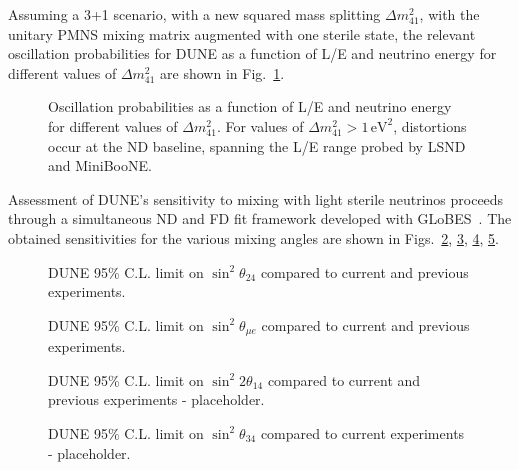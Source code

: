 Assuming a 3+1 scenario, with a new squared mass splitting $\Delta m^2_{41}$, with the unitary PMNS mixing matrix augmented with one sterile state, the relevant oscillation probabilities for DUNE as a function of L/E and neutrino energy for different values of $\Delta m^2_{41}$ are shown in Fig.~\ref{fig:LoverE}. 
\begin{figure}[!htbp]
\caption{\label{fig:LoverE} Oscillation probabilities as a function of L/E and neutrino energy for different values of $\Delta m^2_{41}$. For values of $\Delta m^2_{41} > 1\,\mathrm{eV}^2$, distortions occur at the ND baseline, spanning the L/E range probed by LSND and MiniBooNE.}
\end{figure}

Assessment of DUNE's sensitivity to mixing with light sterile neutrinos proceeds through a simultaneous ND and FD fit framework developed with GLoBES~\cite{ref:globes}.
The obtained sensitivities for the various mixing angles are shown in Figs.~\ref{fig:th_24}, \ref{fig:th_mue}, \ref{fig:th_14}, \ref{fig:th_34}. 

\begin{figure}[!htbp]
\centering
\caption{\label{fig:th_24} DUNE 95\% C.L. limit on $\sin^2 \theta_{24}$ compared to current and previous experiments.}
\end{figure}

\begin{figure}[!htbp]
\centering
\caption{\label{fig:th_mue} DUNE 95\% C.L. limit on $\sin^2 \theta_{\mu e}$ compared to current and previous experiments.}
\end{figure}

\begin{figure}[!htbp]
\centering
\caption{\label{fig:th_14} DUNE 95\% C.L. limit on $\sin^2 2\theta_{14}$ compared to current and previous experiments - placeholder.}
\end{figure}

\begin{figure}[!htbp]
\centering
\caption{\label{fig:th_34} DUNE 95\% C.L. limit on $\sin^2 \theta_{34}$ compared to current experiments - placeholder.}
\end{figure}

